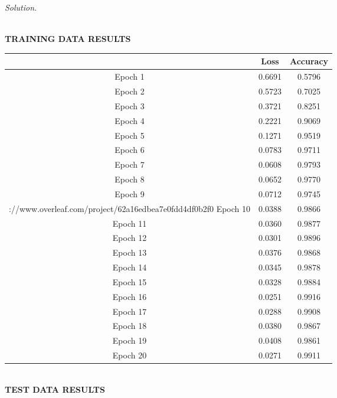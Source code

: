 \documentclass[12pt]{article}
\newcommand\sol[1]{\begin{mdframed}
\emph{Solution.} #1
\end{mdframed}}
\begin{document}
\begin{enumerate}
\begin{itemize}
\end{itemize}



\sol{
\begin{center}
  \textbf{\\TRAINING DATA RESULTS}  
\end{center}

\begin{center}
\begin{tabular}{||c c c ||} 
 \hline
       & Loss & Accuracy \\ [0.5ex] 
 \hline\hline
 Epoch 1  & 0.6691 & 0.5796 \\ 
 \hline
 Epoch 2 & 0.5723 & 0.7025 \\
 \hline
 Epoch 3   & 0.3721  & 0.8251\\
 \hline
 Epoch 4  & 0.2221 & 0.9069\\
 \hline
 Epoch 5  & 0.1271 & 0.9519 \\ 
 \hline
 Epoch 6 & 0.0783 & 0.9711 \\
 \hline
 Epoch 7  & 0.0608  & 0.9793 \\
 \hline
 Epoch 8  & 0.0652 & 0.9770  \\
 \hline
 Epoch 9  & 0.0712  & 0.9745 \\ 
 \hlinehttps://www.overleaf.com/project/62a16edbea7e0fdd4df0b2f0
 Epoch 10 & 0.0388 & 0.9866   \\
 \hline
 Epoch 11   & 0.0360 & 0.9877  \\
 \hline
 Epoch 12  & 0.0301 & 0.9896  \\
 \hline
 Epoch 13  & 0.0376 & 0.9868  \\
 \hline
 Epoch 14 & 0.0345 & 0.9878 \\ 
 \hline
 Epoch 15 & 0.0328 & 0.9884  \\
 \hline
 Epoch 16   & 0.0251 & 0.9916  \\
 \hline
 Epoch 17  & 0.0288 & 0.9908   \\
 \hline
 Epoch 18  & 0.0380 & 0.9867 \\
 \hline
 Epoch 19  & 0.0408 & 0.9861 \\
 \hline
  Epoch 20  & 0.0271 & 0.9911  \\
 \hline

\end{tabular}
\end{center}


\begin{center}
  \textbf{\\TEST DATA RESULTS}  
\end{center}

}
\end{enumerate}
\end{document}
